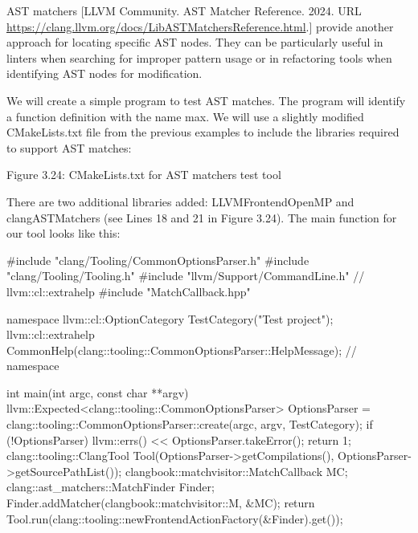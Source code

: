 AST matchers [LLVM Community. AST Matcher Reference. 2024. URL \url{https://clang.llvm.org/docs/LibASTMatchersReference.html}.] provide another approach for locating specific AST nodes. They can be particularly useful in linters when searching for improper pattern usage or in refactoring tools when identifying AST nodes for modification.

We will create a simple program to test AST matches. The program will identify a function definition with the name max. We will use a slightly modified CMakeLists.txt file from the previous examples to include the libraries required to support AST matches:


\begin{center}
Figure 3.24: CMakeLists.txt for AST matchers test tool
\end{center}

There are two additional libraries added: LLVMFrontendOpenMP and clangASTMatchers (see Lines 18 and 21 in Figure 3.24). The main function for our tool looks like this:

\begin{cpp}
#include "clang/Tooling/CommonOptionsParser.h"
#include "clang/Tooling/Tooling.h"
#include "llvm/Support/CommandLine.h" // llvm::cl::extrahelp
#include "MatchCallback.hpp"

namespace {
llvm::cl::OptionCategory TestCategory("Test project");
llvm::cl::extrahelp
  CommonHelp(clang::tooling::CommonOptionsParser::HelpMessage);
} // namespace

int main(int argc, const char **argv) {
  llvm::Expected<clang::tooling::CommonOptionsParser> OptionsParser =
    clang::tooling::CommonOptionsParser::create(argc, argv, TestCategory);
  if (!OptionsParser) {
    llvm::errs() << OptionsParser.takeError();
    return 1;
  }
  clang::tooling::ClangTool Tool(OptionsParser->getCompilations(),
                                 OptionsParser->getSourcePathList());
  clangbook::matchvisitor::MatchCallback MC;
  clang::ast_matchers::MatchFinder Finder;
  Finder.addMatcher(clangbook::matchvisitor::M, &MC);
  return Tool.run(clang::tooling::newFrontendActionFactory(&Finder).get());
}
\end{cpp}

